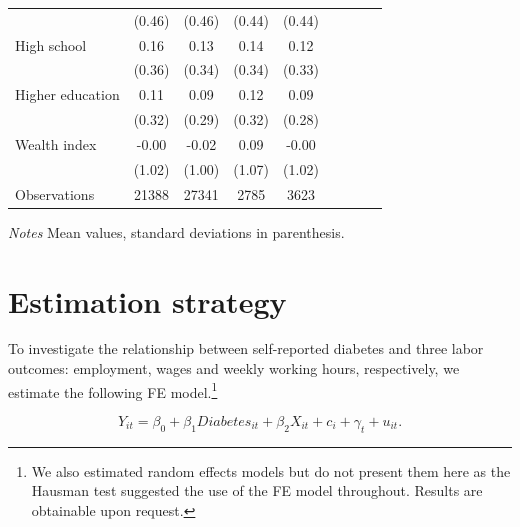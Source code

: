 \documentclass[12pt,english]{article}
\begin{document}
\begin{table}[p]
\begin{adjustbox}{max width=0.7\linewidth, center}
\begin{threeparttable}
{\begin{tabular}{l*{4}{SS}}
                    &      (0.46)&      (0.46)&      (0.44)&      (0.44)\\
\hspace*{10mm}High school         &        0.16&        0.13&        0.14&        0.12\\
                    &      (0.36)&      (0.34)&      (0.34)&      (0.33)\\
\hspace*{10mm}Higher education    &        0.11&        0.09&        0.12&        0.09\\
                    &      (0.32)&      (0.29)&      (0.32)&      (0.28)\\
Wealth index        &       -0.00&       -0.02&        0.09&       -0.00\\
                    &      (1.02)&      (1.00)&      (1.07)&      (1.02)\\           
\midrule
Observations        &    21388&       27341&        2785&        3623\\
\bottomrule
\end{tabular}
\begin{tablenotes}
\item \footnotesize \textit{Notes} Mean values, standard deviations in parenthesis.
\end{tablenotes}
}
\end{threeparttable}
\end{adjustbox}
\end{table}




\section{\label{sec:Estimation Strategy}Estimation strategy}


\textit{}

To investigate the relationship between self-reported diabetes and three labor outcomes: employment, wages and weekly working hours, respectively, we estimate the following \acf{FE} model.\footnote{We also estimated random effects models but do not present them here as the Hausman test suggested the use of the FE model throughout. Results are obtainable upon request.}


\noindent 
\begin{equation}
Y_{it}=\beta_{0}+\beta_{1}Diabetes_{it}+\beta_{2}X_{it}+c_{i}+\gamma_{t}+u_{it}.\label{eq:cha4_employed}
\end{equation}
\end{document}
